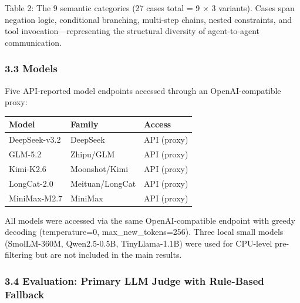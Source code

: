 Table 2: The 9 semantic categories (27 cases total = 9 × 3 variants). Cases span negation logic, conditional branching, multi-step chains, nested constraints, and tool invocation---representing the structural diversity of agent-to-agent communication.



\subsubsection{3.3 Models}\label{models}



Five API-reported model endpoints accessed through an OpenAI-compatible proxy:



{\def\LTcaptype{none} %

\begin{longtable}[]{@{}lll@{}}

\toprule\noalign{}

Model & Family & Access \\

\midrule\noalign{}

\endhead

\bottomrule\noalign{}

\endlastfoot

DeepSeek-v3.2 & DeepSeek & API (proxy) \\

GLM-5.2 & Zhipu/GLM & API (proxy) \\

Kimi-K2.6 & Moonshot/Kimi & API (proxy) \\

LongCat-2.0 & Meituan/LongCat & API (proxy) \\

MiniMax-M2.7 & MiniMax & API (proxy) \\

\end{longtable}

}



All models were accessed via the same OpenAI-compatible endpoint with greedy decoding (temperature=0, max\_new\_tokens=256). Three local small models (SmolLM-360M, Qwen2.5-0.5B, TinyLlama-1.1B) were used for CPU-level pre-filtering but are not included in the main results.



\subsubsection{3.4 Evaluation: Primary LLM Judge with Rule-Based Fallback}\label{evaluation-primary-llm-judge-with-rule-based-fallback}



